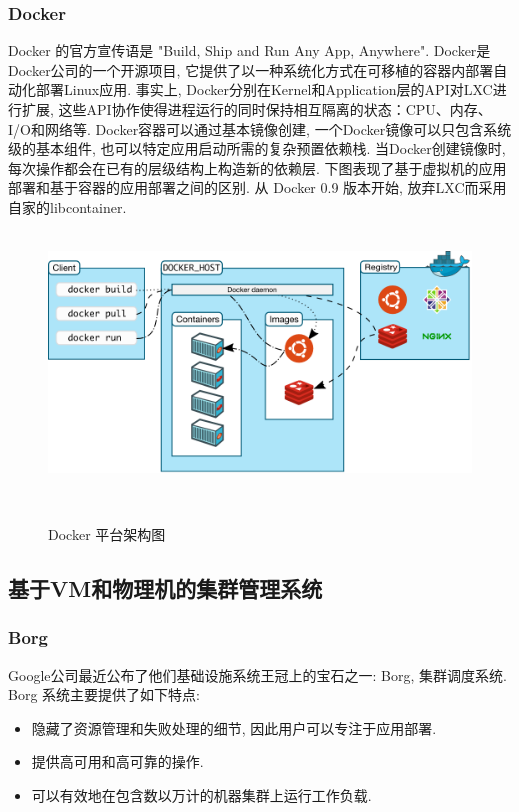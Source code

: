\documentclass[UTF8,a4paper]{ctexart}
\begin{document}
\subsubsection{Docker}
Docker 的官方宣传语是 "Build, Ship and Run Any App, Anywhere".
Docker是Docker公司的一个开源项目, 它提供了以一种系统化方式在可移植的容器内部署自动化部署Linux应用. 事实上, Docker分别在Kernel和Application层的API对LXC进行扩展, 这些API协作使得进程运行的同时保持相互隔离的状态：CPU、内存、I/O和网络等. Docker容器可以通过基本镜像创建, 一个Docker镜像可以只包含系统级的基本组件, 也可以特定应用启动所需的复杂预置依赖栈. 当Docker创建镜像时, 每次操作都会在已有的层级结构上构造新的依赖层. 下图表现了基于虚拟机的应用部署和基于容器的应用部署之间的区别. 从 Docker 0.9 版本开始, 放弃LXC而采用自家的libcontainer.
\begin{figure}[htb]
   　　\centering
   　　\includegraphics[width=.9\textwidth]{diagram/docker_arch.png}
   　　\caption{Docker 平台架构图}
   　　\label{docker_arch}
\end{figure}

\subsection{基于VM和物理机的集群管理系统}
\subsubsection{Borg}
Google公司最近公布了他们基础设施系统王冠上的宝石之一: Borg\cite{Borg2015}, 集群调度系统. Borg 系统主要提供了如下特点:
\begin{itemize}
    \item 隐藏了资源管理和失败处理的细节, 因此用户可以专注于应用部署.
    \item 提供高可用和高可靠的操作.
    \item 可以有效地在包含数以万计的机器集群上运行工作负载.
\end{itemize}
\end{document}
